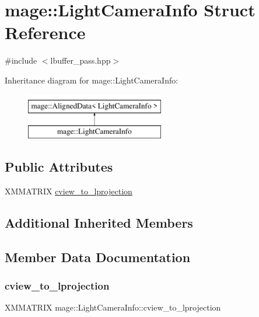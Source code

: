\hypertarget{structmage_1_1_light_camera_info}{}\section{mage\+:\+:Light\+Camera\+Info Struct Reference}
\label{structmage_1_1_light_camera_info}


{\ttfamily \#include $<$lbuffer\+\_\+pass.\+hpp$>$}

Inheritance diagram for mage\+:\+:Light\+Camera\+Info\+:\begin{figure}[H]
\begin{center}
\leavevmode
\includegraphics[height=2.000000cm]{structmage_1_1_light_camera_info}
\end{center}
\end{figure}
\subsection*{Public Attributes}
\begin{DoxyCompactItemize}
\item 
X\+M\+M\+A\+T\+R\+IX \hyperlink{structmage_1_1_light_camera_info_abb4a7fbcc59c50a192c2c77d653f388d}{cview\+\_\+to\+\_\+lprojection}
\end{DoxyCompactItemize}
\subsection*{Additional Inherited Members}


\subsection{Member Data Documentation}
\hypertarget{structmage_1_1_light_camera_info_abb4a7fbcc59c50a192c2c77d653f388d}{}\label{structmage_1_1_light_camera_info_abb4a7fbcc59c50a192c2c77d653f388d} 
\subsubsection{\texorpdfstring{cview\+\_\+to\+\_\+lprojection}{cview\_to\_lprojection}}
{\footnotesize\ttfamily X\+M\+M\+A\+T\+R\+IX mage\+::\+Light\+Camera\+Info\+::cview\+\_\+to\+\_\+lprojection}

